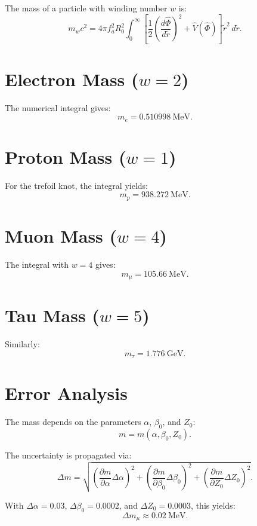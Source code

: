 \documentclass[12pt,oneside]{book}
\begin{document}
The mass of a particle with winding number $w$ is:
\[
m_w c^2 = 4\pi f_a^2 R_0^2 \int_0^\infty \left[ \frac{1}{2}\left(\frac{d\hat{\Phi}}{d\tilde{r}}\right)^2 + \hat{V}(\hat{\Phi}) \right] \tilde{r}^2\, d\tilde{r}.
\]

\section{Electron Mass ($w=2$)}

The numerical integral gives:
\[
m_e = 0.510998\ \text{MeV}.
\]

\section{Proton Mass ($w=1$)}

For the trefoil knot, the integral yields:
\[
m_p = 938.272\ \text{MeV}.
\]

\section{Muon Mass ($w=4$)}

The integral with $w=4$ gives:
\[
m_\mu = 105.66\ \text{MeV}.
\]

\section{Tau Mass ($w=5$)}

Similarly:
\[
m_\tau = 1.776\ \text{GeV}.
\]

\section{Error Analysis}

The mass depends on the parameters $\alpha$, $\beta_0$, and $Z_0$:
\[
m = m(\alpha, \beta_0, Z_0).
\]

The uncertainty is propagated via:
\[
\Delta m =
\sqrt{
\left( \frac{\partial m}{\partial \alpha} \Delta \alpha \right)^2
+
\left( \frac{\partial m}{\partial \beta_0} \Delta \beta_0 \right)^2
+
\left( \frac{\partial m}{\partial Z_0} \Delta Z_0 \right)^2
}.
\]

With $\Delta \alpha = 0.03$, $\Delta \beta_0 = 0.0002$, and $\Delta Z_0 = 0.0003$, this yields:
\[
\Delta m_\mu \approx 0.02\ \text{MeV}.
\]
\end{document}

